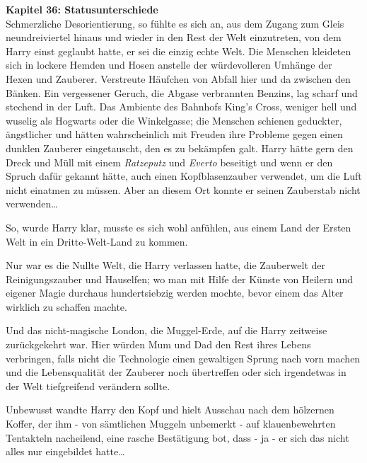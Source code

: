 

\hypertarget{statusunterschiede}{%

\textbf{Kapitel 36: Statusunterschiede}\\

Schmerzliche Desorientierung, so fühlte es sich an, aus dem Zugang zum Gleis neundreiviertel hinaus und wieder in den Rest der Welt einzutreten, von dem Harry einst geglaubt hatte, er sei die einzig echte Welt. Die Menschen kleideten sich in lockere Hemden und Hosen anstelle der würdevolleren Umhänge der Hexen und Zauberer. Verstreute Häufchen von Abfall hier und da zwischen den Bänken. Ein vergessener Geruch, die Abgase verbrannten Benzins, lag scharf und stechend in der Luft. Das Ambiente des Bahnhofs King's Cross, weniger hell und wuselig als Hogwarts oder die Winkelgasse; die Menschen schienen geduckter, ängstlicher und hätten wahrscheinlich mit Freuden ihre Probleme gegen einen dunklen Zauberer eingetauscht, den es zu bekämpfen galt. Harry hätte gern den Dreck und Müll mit einem \emph{Ratzeputz} und \emph{Everto} beseitigt und wenn er den Spruch dafür gekannt hätte, auch einen Kopfblasenzauber verwendet, um die Luft nicht einatmen zu müssen. Aber an diesem Ort konnte er seinen Zauberstab nicht verwenden…

So, wurde Harry klar, musste es sich wohl anfühlen, aus einem Land der Ersten Welt in ein Dritte-Welt-Land zu kommen.

Nur war es die Nullte Welt, die Harry verlassen hatte, die Zauberwelt der Reinigungszauber und Hauselfen; wo man mit Hilfe der Künste von Heilern und eigener Magie durchaus hundertsiebzig werden mochte, bevor einem das Alter wirklich zu schaffen machte.

Und das nicht-magische London, die Muggel-Erde, auf die Harry zeitweise zurückgekehrt war. Hier würden Mum und Dad den Rest ihres Lebens verbringen, falls nicht die Technologie einen gewaltigen Sprung nach vorn machen und die Lebensqualität der Zauberer noch übertreffen oder sich irgendetwas in der Welt tiefgreifend verändern sollte.

Unbewusst wandte Harry den Kopf und hielt Ausschau nach dem hölzernen Koffer, der ihm - von sämtlichen Muggeln unbemerkt - auf klauenbewehrten Tentakteln nacheilend, eine rasche Bestätigung bot, dass - ja - er sich das nicht alles nur eingebildet hatte…

}
